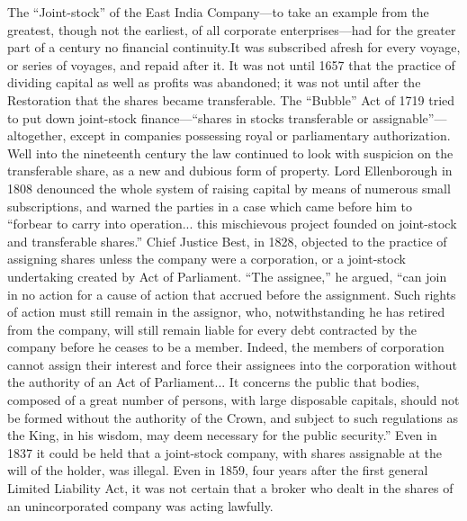 \documentclass{book}
\begin{document}
The “Joint-stock” of the East India Company—to take an example from the greatest, though not the earliest, of all corporate enterprises—had for the greater part of a century no financial continuity.\footnotemark[3] It was subscribed afresh for every voyage, or series of voyages, and repaid after it. It was not until 1657 that the practice of dividing capital as well as profits was abandoned; it was not until after the Restoration that the shares became transferable. The “Bubble” Act of 1719 tried to put down joint-stock finance—“shares in stocks transferable or assignable”—altogether, except in companies possessing royal or parliamentary authorization. Well into the nineteenth century the law continued to look with suspicion on the transferable share, as a new and dubious form of property. Lord Ellenborough in 1808 denounced the whole system of raising capital by means of numerous small subscriptions, and warned the parties in a case which came before him to “forbear to carry into operation... this mischievous project founded on joint-stock and transferable shares.” Chief Justice Best, in 1828, objected to the practice of assigning shares unless the company were a corporation, or a joint-stock undertaking created by Act of Parliament. “The assignee,” he argued, “can join in no action for a cause of action that accrued before the assignment. Such rights of action must still remain in the assignor, who, notwithstanding he has retired from the company, will still remain liable for every debt contracted by the company before he ceases to be a member. Indeed, the members of corporation cannot assign their interest and force their assignees into the corporation without the authority of an Act of Parliament... It concerns the public that bodies, composed of a great number of persons, with large disposable capitals, should not be formed without the authority of the Crown, and subject to such regulations as the King, in his wisdom, may deem necessary for the public security.” Even in 1837 it could be held that a joint-stock company, with shares assignable at the will of the holder, was illegal. Even in 1859, four years after the first general Limited Liability Act, it was not certain that a broker who dealt in the shares of an unincorporated company was acting lawfully.\footnotemark[4]
\end{document}
